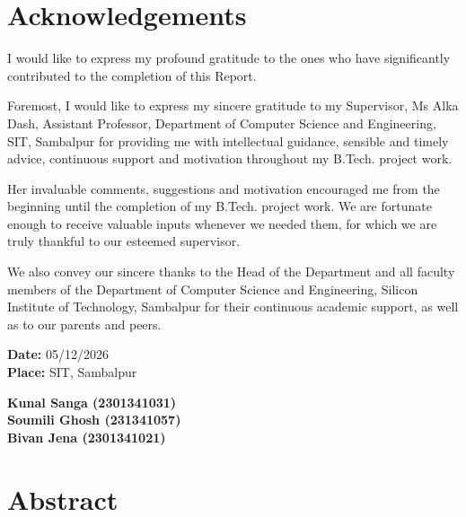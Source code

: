 \documentclass[12pt,a4paper,oneside]{report}
\begin{document}
\clearpage

\chapter*{Acknowledgements}

\justifying

I would like to express my profound gratitude to the ones who have significantly contributed to the completion of this Report.

Foremost, I would like to express my sincere gratitude to my Supervisor,
Ms Alka Dash, Assistant Professor, Department of Computer Science and
Engineering, SIT, Sambalpur for providing me with intellectual guidance,
sensible and timely advice, continuous support and motivation throughout
my B.Tech. project work.

Her invaluable comments, suggestions and motivation encouraged me from
the beginning until the completion of my B.Tech. project work. We are
fortunate enough to receive valuable inputs whenever we needed them,
for which we are truly thankful to our esteemed supervisor.

We also convey our sincere thanks to the Head of the Department and all faculty members of the Department of Computer Science and Engineering, Silicon Institute of Technology, Sambalpur for their continuous academic support, as well as to our parents and peers.

\vspace{0.8cm}

\noindent
\textbf{Date:} 05/12/2026\\
\textbf{Place:} SIT, Sambalpur

\vspace{0.8cm}

\begin{flushright}
\textbf{
Kunal Sanga (2301341031)\\
Soumili Ghosh (231341057)\\
Bivan Jena (2301341021)
}
\end{flushright}


\clearpage

\chapter*{Abstract}
\end{document}
